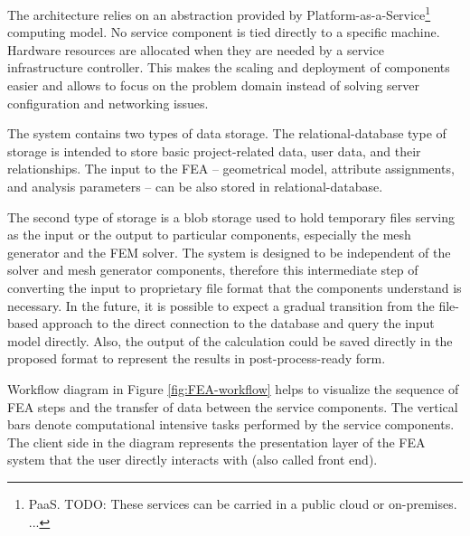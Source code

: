 The architecture relies on an abstraction provided by Platform-as-a-Service\footnote{PaaS. TODO: These services can be carried in a public cloud or on-premises. ...} computing model. No service component is tied directly to a specific machine. Hardware resources are allocated when they are needed by a service infrastructure controller. This makes the scaling and deployment of components easier and allows to focus on the problem domain instead of solving server configuration and networking issues.

The system contains two types of data storage. The relational-database type of storage is intended to store basic project-related data, user data, and their relationships. The input to the FEA -- geometrical model, attribute assignments, and analysis parameters -- can be also stored in relational-database. %

The second type of storage is a blob storage used to hold temporary files serving as the input or the output to particular components, especially the mesh generator and the FEM solver. The system is designed to be independent of the solver and mesh generator components, therefore this intermediate step of converting the input to proprietary file format that the components understand is necessary. In the future, it is possible to expect a gradual transition from the file-based approach to the direct connection to the database and query the input model directly. Also, the output of the calculation could be saved directly in the proposed format to represent the results in post-process-ready form.

Workflow diagram in Figure \ref{fig:FEA-workflow} helps to visualize the sequence of FEA steps and the transfer of data between the service components. The vertical bars denote computational intensive tasks performed by the service components. The client side in the diagram represents the presentation layer of the FEA system that the user directly interacts with (also called front end).

